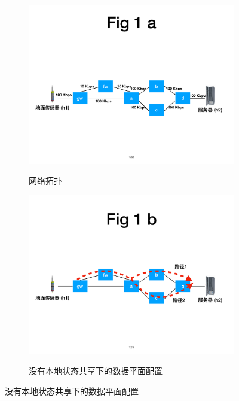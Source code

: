 \begin{figure}[!htbp]
\centering

  \begin{subfigure}[b]{\linewidth}
      \includegraphics[width=\linewidth]{figures/ss-122.pdf}
      \label{fig:fw-topo}
      \caption{网络拓扑}
  \end{subfigure}


\hspace{0.03\linewidth}

  \begin{subfigure}[b]{\linewidth}
      \includegraphics[width=\linewidth]{figures/ss-123.pdf}
      \label{fig:existing-result}
      \caption{没有本地状态共享下的数据平面配置}
  \end{subfigure}



\end{figure}
